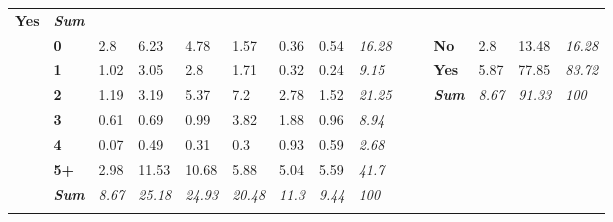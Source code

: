 {\begin{center}
\begin{longtable}{lllllllllllllll}
  \textbf{Yes} &
  \textit{\textbf{Sum}} \\
 &
  \textbf{0} &
  \cellcolor[HTML]{EAEAEA}2.8 &
  \cellcolor[HTML]{D0D0D0}6.23 &
  \cellcolor[HTML]{DBDBDB}4.78 &
  \cellcolor[HTML]{F4F4F4}1.57 &
  \cellcolor[HTML]{FDFDFD}0.36 &
  \cellcolor[HTML]{FCFCFC}0.54 &
  \textit{16.28} &
   &
   &
  \textbf{No} &
  \cellcolor[HTML]{FFFFFF}2.8 &
  \cellcolor[HTML]{F3F3F3}13.48 &
  \textit{16.28} \\
 &
  \textbf{1} &
  \cellcolor[HTML]{F8F8F8}1.02 &
  \cellcolor[HTML]{E8E8E8}3.05 &
  \cellcolor[HTML]{EAEAEA}2.8 &
  \cellcolor[HTML]{F3F3F3}1.71 &
  \cellcolor[HTML]{FEFEFE}0.32 &
  \cellcolor[HTML]{FEFEFE}0.24 &
  \textit{9.15} &
   &
   &
  \textbf{Yes} &
  \cellcolor[HTML]{FCFCFC}5.87 &
  \cellcolor[HTML]{A6A6A6}77.85 &
  \textit{83.72} \\
 &
  \textbf{2} &
  \cellcolor[HTML]{F7F7F7}1.19 &
  \cellcolor[HTML]{E7E7E7}3.19 &
  \cellcolor[HTML]{D6D6D6}5.37 &
  \cellcolor[HTML]{C8C8C8}7.2 &
  \cellcolor[HTML]{EAEAEA}2.78 &
  \cellcolor[HTML]{F4F4F4}1.52 &
  \textit{21.25} &
   &
   &
  \textit{\textbf{Sum}} &
  \textit{8.67} &
  \textit{91.33} &
  \textit{100} \\
 &
  \textbf{3} &
  \cellcolor[HTML]{FBFBFB}0.61 &
  \cellcolor[HTML]{FBFBFB}0.69 &
  \cellcolor[HTML]{F8F8F8}0.99 &
  \cellcolor[HTML]{E2E2E2}3.82 &
  \cellcolor[HTML]{F1F1F1}1.88 &
  \cellcolor[HTML]{F9F9F9}0.96 &
  \textit{8.94} &
   &
   &
   &
   &
   &
  \textit{} \\
 &
  \textbf{4} &
  \cellcolor[HTML]{FFFFFF}0.07 &
  \cellcolor[HTML]{FCFCFC}0.49 &
  \cellcolor[HTML]{FEFEFE}0.31 &
  \cellcolor[HTML]{FEFEFE}0.3 &
  \cellcolor[HTML]{F9F9F9}0.93 &
  \cellcolor[HTML]{FBFBFB}0.59 &
  \textit{2.68} &
   &
   &
   &
   &
   &
  \textit{} \\
 &
  \textbf{5+} &
  \cellcolor[HTML]{E9E9E9}2.98 &
  \cellcolor[HTML]{A6A6A6}11.53 &
  \cellcolor[HTML]{ADADAD}10.68 &
  \cellcolor[HTML]{D2D2D2}5.88 &
  \cellcolor[HTML]{D9D9D9}5.04 &
  \cellcolor[HTML]{D5D5D5}5.59 &
  \textit{41.7} &
   &
   &
   &
   &
   &
  \textit{} \\
\textit{} &
  \textit{\textbf{Sum}} &
  \textit{8.67} &
  \textit{25.18} &
  \textit{24.93} &
  \textit{20.48} &
  \textit{11.3} &
  \textit{9.44} &
  \textit{100} &
  \textit{} &
  \textit{} &
  \textit{} &
  \textit{} &
  \textit{} &
  \textit{} \\
\textit{} &
  \textit{\textbf{}} &
  \textit{} &
  \textit{} &
  \textit{} &
  \textit{} &
  \textit{} &
  \textit{} &
  \textit{} &
  \textit{} &

\end{longtable}
\end{center}}
